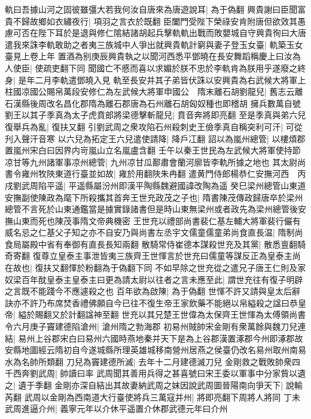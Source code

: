 軌曰吾據山河之固彼雖彊大若我何汝自唐來為唐遊說耳|{
	為于偽翻}
興貴謝曰臣聞富貴不歸故鄉如衣繡夜行|{
	項羽之言衣於既翻}
臣闔門受陛下榮祿安肯附唐但欲效其愚慮可否在陛下耳於是退與修仁隂結諸胡起兵擊軌軌出戰而敗嬰城自守興貴徇曰大唐遣我來誅李軌敢助之者夷三族城中人爭出就興貴軌計窮與妻子登玉女臺|{
	軌築玉女臺見上卷上年}
置酒為别庚辰興貴執之以聞河西悉平鄧曉在長安舞蹈稱慶上曰汝為人使臣|{
	使疏吏翻下同}
聞國亡不慼而喜以求媚於朕不忠於李軌肯為朕用乎遂廢之終身|{
	是年二月李軌遣鄧曉入見}
軌至長安并其子弟皆伏誅以安興貴為右武候大將軍上柱國凉國公賜帛萬段安修仁為左武候大將軍申國公　隋末離石胡劉龍兒|{
	舊志云離石漢縣後周改名昌化郡隋為離石郡唐為石州離石胡匈奴種也即稽胡}
擁兵數萬自號劉王以其子季真為太子虎賁郎將梁德擊斬龍兒|{
	賁音奔將即亮翻}
至是季真與弟六兒復舉兵為亂|{
	復扶又翻}
引劉武周之衆攻陷石州殺刺史王儉季真自稱突利可汗|{
	可從刋入聲汗音寒}
以六兒為拓定王六兒遣使請降|{
	降戶冮翻}
詔以為嵐州總管|{
	以樓煩郡置嵐州宋白曰因界内岢嵐山立名嵐盧含翻}
壬午以秦王世民為左武候大將軍使持節凉甘等九州諸軍事凉州總管|{
	九州凉甘瓜鄯肅會蘭河廓皆李軌所據之地也}
其太尉尚書令雍州牧陜東道行臺並如故|{
	雍於用翻陜朱冉翻}
遣黄門侍郎楊恭仁安撫河西　丙戌劉武周陷平遥|{
	平遥縣屬汾州即漢平陶縣魏避國諱改陶為遥}
癸巳梁州總管山東道安撫副使陳政為麾下所殺攜其首奔王世充政茂之子也|{
	隋書陳茂傳政歸唐卒於梁州總管不言死於山東通鑑當是據實錄諸書但是時山東無梁州或者政先為梁州總管後安撫山東而死也陳茂事隋文帝典機密}
王世充以禮部尚書裴仁基左輔大將軍裴行儼有威名忌之仁基父子知之亦不自安乃與尚書左丞宇文儒童儒童弟尚食直長温|{
	隋制尚食局屬殿中省有奉御有直長長知兩翻}
散騎常侍崔德本謀殺世充及其黨|{
	散悉亶翻騎奇寄翻}
復尊立皇泰主事泄皆夷三族齊王世惲言於世充曰儒童等謀反正為皇泰主尚在故也|{
	復扶又翻惲於粉翻為于偽翻下同}
不如早除之世充從之遣兄子唐王仁則及家奴梁百年酖皇泰主皇泰主曰更為請太尉以往者之言未應至此|{
	謂世充往有復子明辟之言既不能踐今不應遽殺之也}
百年欲為啟陳|{
	為于偽翻}
世惲不許又請與皇太后辭訣亦不許乃布席焚香禮佛願自今已往不復生帝王家飲藥不能絕以帛縊殺之諡曰恭皇帝|{
	縊於賜翻又於計翻諡神至翻}
世充以其兄楚王世偉為太保齊王世惲為太傅領尚書令六月庚子竇建德陷滄州|{
	滄州隋之勃海郡}
初易州賊帥宋金剛有衆萬餘與魏刀兒連結|{
	易州上谷郡宋白曰易州六國時燕地秦并天下是為上谷郡漢置涿郡今州即涿郡故安縣地圖經云隋初自今遂城縣所理英雄城移南營州居燕之侯臺仍改名易州取州南易水為名帥所類翻}
刀兒為竇建德所滅|{
	去年十二月建德滅刀兒}
金剛救之戰敗帥衆四千西奔劉武周|{
	帥讀曰率}
武周聞其善用兵得之甚喜號曰宋王委以軍事中分家貲以遺之|{
	遺于季翻}
金剛亦深自結出其故妻納武周之妺因說武周圖晉陽南向爭天下|{
	說輸芮翻}
武周以金剛為西南道大行臺使將兵三萬寇并州|{
	將即亮翻下周將人將同}
丁未武周進逼介州|{
	義寧元年以介休平遥置介休郡武德元年曰介州}
